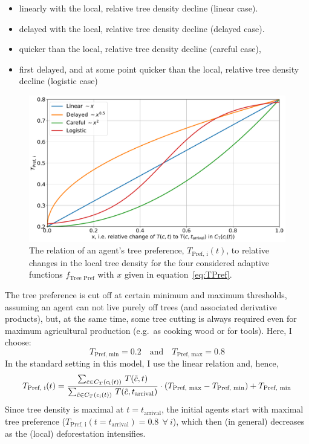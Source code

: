 \begin{itemize}
	\item linearly with the local, relative tree density decline (linear case).  
	\item delayed with the local, relative tree density decline (delayed case).
	\item quicker than the local, relative tree density decline (careful case),
	\item first delayed, and at some point quicker than the local, relative tree density decline (logistic case) 
\end{itemize}
\begin{figure}
	\centering
	\includegraphics[width=\textwidth]{images/TPref}
	\caption{The relation of an agent's tree preference, $T_\text{Pref, i}(t)$, to relative changes in the local tree density for the four considered adaptive functions $f_\text{Tree Pref}$ with $x$ given in equation~\ref{eq:TPref}.}
	\label{fig:TPref_T}
\end{figure}
The tree preference is cut off at certain minimum and maximum thresholds, assuming an agent can not live purely off trees (and associated derivative products), but, at the same time, some tree cutting is always required even for maximum agricultural production (e.g.\ as cooking wood or for tools). 
Here, I choose: 
\begin{equation}
T_\text{Pref, min} = 0.2 \quad \text{and} \quad T_\text{Pref, max} = 0.8
\end{equation} 
In the standard setting in this model, I use the linear relation and, hence, 
\begin{equation}
	T_\text{Pref, i}(t) =  \frac{\sum_{\tilde{c} \in C_{T}(c_{\rm i}(t)) } \, T(\tilde{c}, t)}{\sum_{\tilde{c} \in C_{T}(c_{\rm i}(t))} \, T(\tilde{c}, t_\text{arrival}) } \cdot (T_\text{Pref, max}-T_\text{Pref, min}) + T_\text{Pref, min}
\end{equation}
Since tree density is maximal at $t=t_\text{arrival}$, the initial agents start with maximal tree preference ($T_\text{Pref, i}(t=t_\text{arrival}) = 0.8 \ \  \forall \ i$), which then (in general) decreases as the (local) deforestation intensifies.

